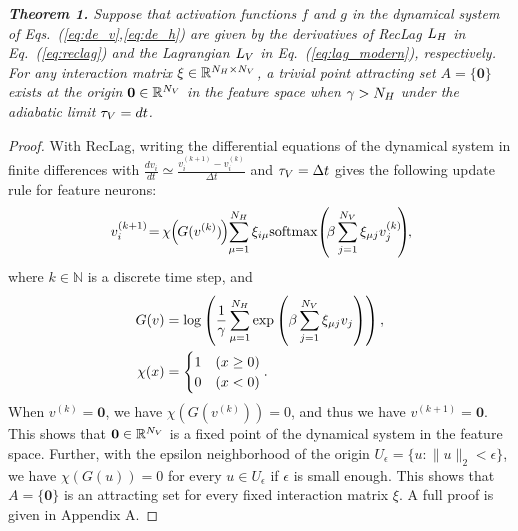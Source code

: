 \vspace{5pt}
\noindent \textit{\textbf{Theorem 1.}
Suppose that activation functions $f$ and $g$ in the dynamical system of Eqs.~(\ref{eq:de_v},\ref{eq:de_h}) are given by the derivatives of RecLag $L_{H}$ in Eq.~(\ref{eq:reclag}) and the Lagrangian $L_{V}$ in Eq.~(\ref{eq:lag_modern}), respectively.
For any interaction matrix $\xi \in \mathbb{R}^{N_{H} \times N_{V}}$,
a trivial point attracting set $A = \{\bm{0}\}$ exists at the origin
$\bm{0} \in \mathbb{R}^{N_{V}}$ in the feature space when $\gamma > N_{H}$ under the adiabatic limit $\tau_{V} = dt$.}
\vspace{-4pt}
\renewcommand{\proofname}{Sketch of proof}
\begin{proof}
With RecLag, writing the differential equations of the dynamical system in finite differences with $\frac{dv_{i}}{dt} \simeq \frac{v^{(k+1)}_{i} - v^{(k)}_{i}}{\Delta t}$ and $\tau_{V} = \Delta t$
gives the following update rule for feature neurons:
\begin{align}
v^{(k+1)}_{i}
\hspace{-2pt}
=
\hspace{-1pt}
\chi
\hspace{-2pt}
\left(
\hspace{-1pt}
G(v^{(k)})
\hspace{-1pt}
\right)
\hspace{-2pt}
\sum_{\mu=1}^{\Numh}
\xi_{i\mu}
\mathrm{softmax}
\hspace{-2pt}
\left(
\hspace{-2pt}
\beta \sum_{j=1}^{\Numv} 
\xi_{\mu j} v^{(k)}_{j}
\hspace{-3pt}
\right)\hspace{-3pt},\hspace{-3pt}
\end{align}
where $k \in \mathbb{N}$ is a discrete time step, and 
\begin{align}
G(v) &=
\log
\left(
\frac{1}{\gamma}
\sum_{\mu = 1}^{N_{H}}
\exp\left({\beta \sum_{j=1}^{N_{V}} \xi_{\mu j} v_{j}} \right)
\right),\\
\chi (x) &=
\begin{cases}
1 & (x \geq 0)\\
0 & (x < 0)
\end{cases}.
\end{align}
When $v^{(k)} = \bm{0}$, we have $\chi(G(v^{(k)})) = 0$, and thus we have $v^{(k+1)} = \bm{0}$.
This shows that $\bm{0} \in \mathbb{R}^{N_{V}}$ is a fixed point of the dynamical system in the feature space.
Further, with the epsilon neighborhood of the origin $U_{\epsilon} = \{u : \| u \|_{2} < \epsilon\}$, we have $\chi(G(u)) = 0$ for every $u \in U_{\epsilon}$ if $\epsilon$ is small enough. This shows that $A = \{\bm{0}\}$ is an attracting set for every fixed interaction matrix $\xi$.
A full proof is given in Appendix A.
\end{proof}

